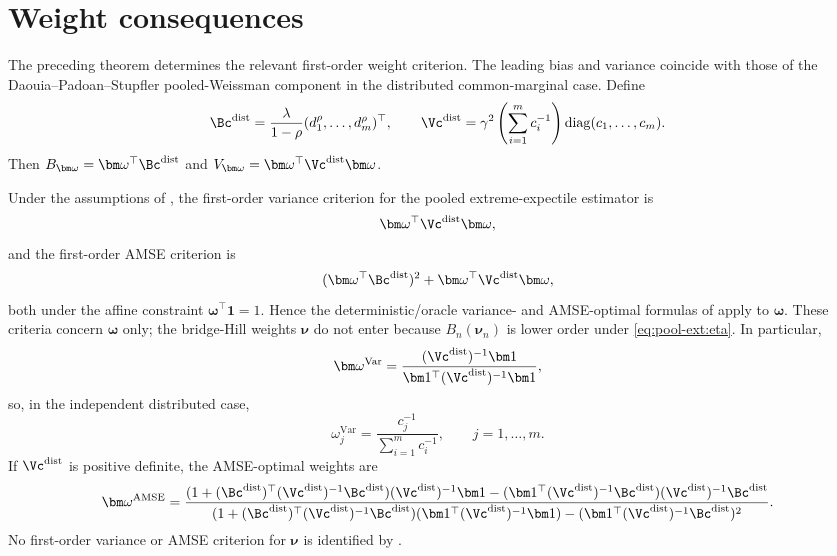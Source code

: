 \section{Weight consequences}
\label{sec:pool-ext:weights}

The preceding theorem determines the relevant first-order weight criterion.
The leading bias and variance coincide with those of the
Daouia--Padoan--Stupfler pooled-Weissman component in the distributed
common-marginal case. Define
\[
  \Bc^{\mathrm{dist}}
  =
  \frac{\lambda}{1-\rho}
  (d_1^\rho,\ldots,d_m^\rho)^\top,
  \qquad
  \Vc^{\mathrm{dist}}
  =
  \gamma^2
  \left(\sum_{i=1}^{m}c_i^{-1}\right)
  \operatorname{diag}(c_1,\ldots,c_m).
\]
Then \(B_{\bm\omega}=\bm\omega^\top\Bc^{\mathrm{dist}}\) and
\(V_{\bm\omega}=\bm\omega^\top\Vc^{\mathrm{dist}}\bm\omega\).

\begin{corollary}
\label{cor:pool-ext:omega-criteria}
Under the assumptions of , the
first-order variance criterion for the pooled extreme-expectile estimator is
\[
  \bm\omega^\top\Vc^{\mathrm{dist}}\bm\omega,
\]
and the first-order AMSE criterion is
\[
  (\bm\omega^\top\Bc^{\mathrm{dist}})^2
  +
  \bm\omega^\top\Vc^{\mathrm{dist}}\bm\omega,
\]
both under the affine constraint \(\bm\omega^\top\bm 1=1\). Hence the
deterministic/oracle variance- and AMSE-optimal formulas of
\textcite{DaouiaPadoanStupfler2021} apply to \(\bm\omega\). These criteria
concern \(\bm\omega\) only; the bridge-Hill weights \(\bm\nu\) do not enter
because \(B_n(\bm\nu_n)\) is lower order under \eqref{eq:pool-ext:eta}. In
particular,
\[
  \bm\omega^{\mathrm{Var}}
  =
  \frac{(\Vc^{\mathrm{dist}})^{-1}\bm 1}
       {\bm 1^\top(\Vc^{\mathrm{dist}})^{-1}\bm 1},
\]
so, in the independent distributed case,
\[
  \omega_j^{\mathrm{Var}}
  =
  \frac{c_j^{-1}}{\sum_{i=1}^{m}c_i^{-1}},
  \qquad j=1,\ldots,m.
\]
If \(\Vc^{\mathrm{dist}}\) is positive definite, the AMSE-optimal weights are
\[
  \bm\omega^{\mathrm{AMSE}}
  =
  \frac{
    (1+(\Bc^{\mathrm{dist}})^\top
        (\Vc^{\mathrm{dist}})^{-1}\Bc^{\mathrm{dist}})
        (\Vc^{\mathrm{dist}})^{-1}\bm 1
    -
    (\bm 1^\top(\Vc^{\mathrm{dist}})^{-1}\Bc^{\mathrm{dist}})
        (\Vc^{\mathrm{dist}})^{-1}\Bc^{\mathrm{dist}}
  }{
    (1+(\Bc^{\mathrm{dist}})^\top
        (\Vc^{\mathrm{dist}})^{-1}\Bc^{\mathrm{dist}})
        (\bm 1^\top(\Vc^{\mathrm{dist}})^{-1}\bm 1)
    -
    (\bm 1^\top(\Vc^{\mathrm{dist}})^{-1}\Bc^{\mathrm{dist}})^2
  }.
\]
No first-order variance or AMSE criterion for \(\bm\nu\) is identified by
.
\end{corollary}

